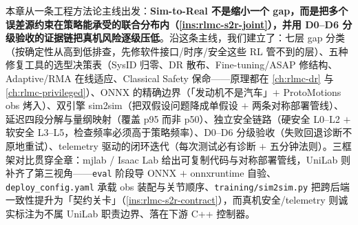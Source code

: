 本章从一条工程方法论主线出发：\textbf{Sim-to-Real 不是缩小一个 gap，而是把多个误差源约束在策略能承受的联合分布内（\cref{ins:rlmc-s2r-joint}），并用 D0--D6 分级验收的证据链把真机风险逐级压低}。沿这条主线，我们建立了：七层 gap 分类（按确定性从高到低排查，先修软件接口/时序/安全这些 RL 管不到的层）、五种修复工具的选型决策表（SysID 归零、DR 散布、Fine-tuning/ASAP 修结构、Adaptive/RMA 在线适应、Classical Safety 保命——原理都在 \cref{ch:rlmc-dr} 与 \cref{ch:rlmc-privileged}）、ONNX 的精确边界（「发动机不是汽车」$+$ ProtoMotions obs 烤入）、双引擎 sim2sim（把双假设问题降成单假设 $+$ 两条对称部署管线）、延迟四段分解与量纲映射（覆盖 p95 而非 p50）、独立安全链路（硬安全 L0--L2 $+$ 软安全 L3--L5，检查频率必须高于策略频率）、D0--D6 分级验收（失败回退诊断不原地重试）、telemetry 驱动的闭环迭代（每次测试必有诊断 $+$ 五分钟法则）。三框架对比贯穿全章：mjlab / Isaac Lab 给出可复制代码与对称部署管线，UniLab 则补齐了第三视角——\verb|eval| 阶段导 ONNX $+$ onnxruntime 自验、\verb|deploy_config.yaml| 承载 obs 装配与关节顺序、\verb|training/sim2sim.py| 把跨后端一致性提升为「契约关卡」（\cref{ins:rlmc-s2r-contract}），而真机安全/telemetry 则诚实标注为不属 UniLab 职责边界、落在下游 C++ 控制器。

